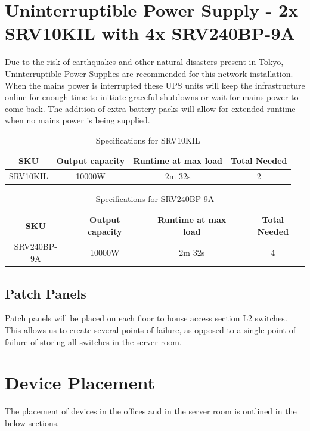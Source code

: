 \section{Uninterruptible Power Supply - 2x SRV10KIL with 4x SRV240BP-9A}
Due to the risk of earthquakes and other natural disasters present in Tokyo, Uninterruptible Power Supplies are recommended for this network installation. When the mains power is interrupted these UPS units will keep the infrastructure online for enough time to initiate graceful shutdowns or wait for mains power to come back.
The addition of extra battery packs will allow for extended runtime when no mains power is being supplied.
\begin{table}[H]
    \centering
    \begin{tabular}{|cccc|}
    \hline
    \multicolumn{1}{|c|}{SKU} & \multicolumn{1}{c|}{Output capacity} & \multicolumn{1}{c|}{Runtime at max load} & Total Needed \\ \hline
    SRV10KIL                  & 10000W                               & 2m 32s                                   & 2            \\ \hline
    \end{tabular}
    \caption{Specifications for SRV10KIL \parencite{ups-specs}}
\end{table}
\begin{table}[H]
    \begin{tabular}{|cccc|}
    \hline
    \multicolumn{1}{|c|}{SKU} & \multicolumn{1}{c|}{Output capacity} & \multicolumn{1}{c|}{Runtime at max load} & Total Needed \\ \hline
    SRV240BP-9A               & 10000W                               & 2m 32s                                   & 4            \\ \hline
    \end{tabular}
    \caption{Specifications for SRV240BP-9A \parencite{bp-specs}}
\end{table}
\subsection{Patch Panels}
Patch panels will be placed on each floor to house access section L2 switches. This allows us to create several points of failure, as opposed to a single point of failure of storing all switches in the server room.
\section{Device Placement}
The placement of devices in the offices and in the server room is outlined in the below sections.

